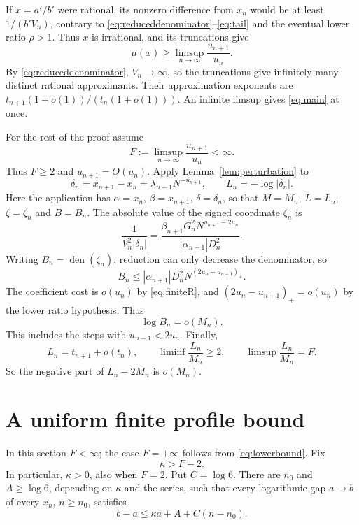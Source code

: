 \documentclass{amsart}
\numberwithin{equation}{section}
\newcommand{\den}{\operatorname{den}}
\begin{document}
If $x=a'/b'$ were rational, its nonzero difference from $x_n$
would be at least $1/(b'V_n)$, contrary to
\eqref{eq:reduceddenominator}--\eqref{eq:tail} and the eventual
lower ratio $\rho>1$. Thus $x$ is irrational, and its truncations give
\begin{equation}\label{eq:lowerbound}
\mu(x)\ge\limsup_{n\to\infty}\frac{u_{n+1}}{u_n}.
\end{equation}
By \eqref{eq:reduceddenominator}, $V_n\to\infty$, so the truncations
give infinitely many distinct rational approximants. Their approximation exponents are
$t_{n+1}(1+o(1))/(t_n(1+o(1)))$. An infinite limsup gives
\eqref{eq:main} at once.

For the rest of the proof assume
\begin{equation}\label{eq:finiteR}
F:=\limsup_{n\to\infty}\frac{u_{n+1}}{u_n}<\infty.
\end{equation}
Thus $F\ge2$ and $u_{n+1}=O(u_n)$. Apply
Lemma~\ref{lem:perturbation} to
\[
\delta_n=x_{n+1}-x_n=\lambda_{n+1}N^{-u_{n+1}},\qquad
L_n=-\log|\delta_n|.
\]
Here the application has $\alpha=x_n$, $\beta=x_{n+1}$, $\delta=\delta_n$, so that $M=M_n$, $L=L_n$, $\zeta=\zeta_n$ and $B=B_n$.
The absolute value of the signed coordinate $\zeta_n$ is
\[
\frac1{V_n^2|\delta_n|}
=\frac{\beta_{n+1}G_n^2N^{u_{n+1}-2u_n}}
{|\alpha_{n+1}|D_n^2}.
\]
Writing $B_n=\den(\zeta_n)$, reduction can only decrease the denominator,
so
\begin{equation}\label{eq:coordinatecost}
B_n\le|\alpha_{n+1}|D_n^2N^{(2u_n-u_{n+1})_+}.
\end{equation}
The coefficient cost is $o(u_n)$ by \eqref{eq:finiteR}, and
$(2u_n-u_{n+1})_+=o(u_n)$ by the lower ratio hypothesis. Thus
\begin{equation}\label{eq:Bsmall}
\log B_n=o(M_n).
\end{equation}
This includes the steps with $u_{n+1}<2u_n$.
Finally,
\begin{equation}\label{eq:Lscales}
L_n=t_{n+1}+o(t_n),\qquad
\liminf\frac{L_n}{M_n}\ge2,\qquad
\limsup\frac{L_n}{M_n}=F.
\end{equation}
So the negative part of $L_n-2M_n$ is $o(M_n)$.

\section{A uniform finite profile bound}\label{sec:uniform}

In this section $F<\infty$; the case $F=+\infty$ follows from
\eqref{eq:lowerbound}.
Fix
\begin{equation}\label{eq:kappa}
\kappa>F-2.
\end{equation}
In particular, $\kappa>0$, also when $F=2$.
Put $C=\log6$. There are $n_0$ and $A\ge\log6$, depending on
$\kappa$ and the series, such that every logarithmic gap $a\to b$ of every $x_n$,
$n\ge n_0$, satisfies
\begin{equation}\label{eq:uniformprofile}
b-a\le\kappa a+A+C(n-n_0).
\end{equation}
\end{document}
